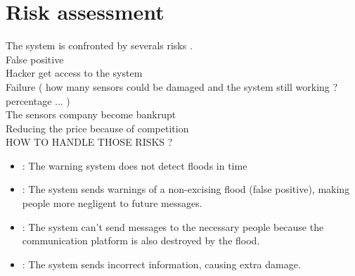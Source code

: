 \section{Risk assessment}

The system is confronted by severals risks .\\
False positive \\
Hacker get access to the system \\
Failure ( how many sensors could be damaged and the system still working ? percentage ... ) \\ 
The sensors company become bankrupt \\
Reducing the price because of competition \\

HOW TO HANDLE THOSE RISKS ?
\begin{itemize}
	\item {}: The warning system does not detect floods in time
	\item {}: The system sends warnings of a non-excising flood (false positive), making people more negligent to future messages.
	\item {}: The system can't send messages to the necessary people because the communication platform is also destroyed by the flood.
	\item {}: The system sends incorrect information, causing extra damage.
\end{itemize}



